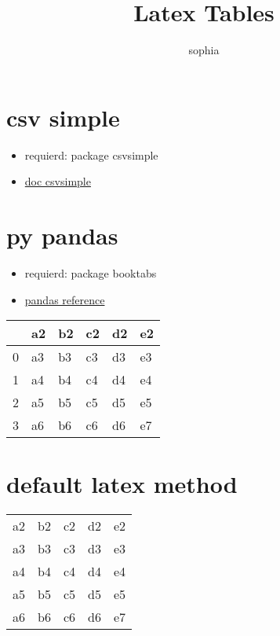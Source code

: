 \documentclass[10pt]{article}
\title{Latex Tables}
\date{}
\author{sophia}
\begin{document}
 
\maketitle
\tableofcontents
 
\section{csv simple}
\begin{itemize}
    \item requierd: package csvsimple
    \item \href{https://mirror.dogado.de/tex-archive/macros/latex/contrib/csvsimple/csvsimple.pdf}{doc csvsimple}
\end{itemize}

\section{py pandas}
\begin{itemize}
    \item requierd: package booktabs
    \item \href{https://pandas.pydata.org/pandas-docs/stable/reference/api/pandas.DataFrame.to_latex.html}{pandas reference}
\end{itemize}
\begin{tabular}{llllll}
    \toprule
    {} &  a2 &  b2 &  c2 &  d2 &  e2 \\
    \midrule
    0 &  a3 &  b3 &  c3 &  d3 &  e3 \\
    1 &  a4 &  b4 &  c4 &  d4 &  e4 \\
    2 &  a5 &  b5 &  c5 &  d5 &  e5 \\
    3 &  a6 &  b6 &  c6 &  d6 &  e7 \\
    \bottomrule
    \end{tabular}

\section{default latex method}
\begin{center}
    \begin{tabular}{ c c c c c }
    a2 & b2 & c2 & d2 & e2 \\ 
    a3 & b3 & c3 & d3 & e3 \\ 
    a4 & b4 & c4 & d4 & e4 \\ 
    a5 & b5 & c5 & d5 & e5 \\ 
    a6 & b6 & c6 & d6 & e7 \\ 
    \end{tabular} 
\end{center}
 
\end{document}
